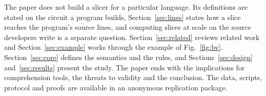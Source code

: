 The paper does not build a slicer for a particular language. Its definitions are stated on the circuit a program
builds, Section~\ref{sec:lines} states how a slice reaches the program's source lines, and computing slices at scale
on the source developers write is a separate question. Section~\ref{sec:related} reviews related work and
Section~\ref{sec:example} works through the example of Fig.~\ref{fig:bv}. Section~\ref{sec:core} defines the
semantics and the rules, and Sections~\ref{sec:design} and~\ref{sec:results} present the study. The paper ends with
the implications for comprehension tools, the threats to validity and the conclusion. The data, scripts, protocol
and proofs are available in an anonymous replication package.

